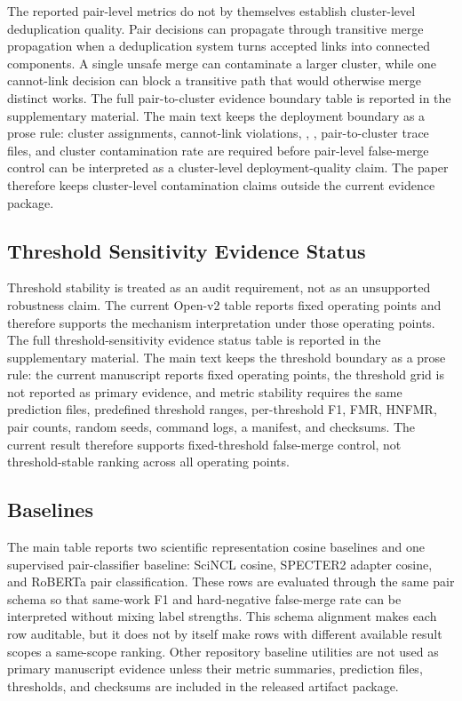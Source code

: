 \documentclass[11pt]{article}
\begin{document}
The reported pair-level metrics do not by themselves establish cluster-level deduplication quality. Pair decisions can propagate through transitive merge propagation when a deduplication system turns accepted links into connected components. A single unsafe merge can contaminate a larger cluster, while one cannot-link decision can block a transitive path that would otherwise merge distinct works. The full pair-to-cluster evidence boundary table is reported in the supplementary material. The main text keeps the deployment boundary as a prose rule: cluster assignments, cannot-link violations, , , pair-to-cluster trace files, and cluster contamination rate are required before pair-level false-merge control can be interpreted as a cluster-level deployment-quality claim. The paper therefore keeps cluster-level contamination claims outside the current evidence package.

\subsection{Threshold Sensitivity Evidence Status}

Threshold stability is treated as an audit requirement, not as an unsupported robustness claim. The current Open-v2 table reports fixed operating points and therefore supports the mechanism interpretation under those operating points. The full threshold-sensitivity evidence status table is reported in the supplementary material. The main text keeps the threshold boundary as a prose rule: the current manuscript reports fixed operating points, the threshold grid is not reported as primary evidence, and metric stability requires the same prediction files, predefined threshold ranges, per-threshold F1, FMR, HNFMR, pair counts, random seeds, command logs, a manifest, and checksums. The current result therefore supports fixed-threshold false-merge control, not threshold-stable ranking across all operating points.

\subsection{Baselines}

The main table reports two scientific representation cosine baselines and one supervised pair-classifier baseline: SciNCL cosine, SPECTER2 adapter cosine, and RoBERTa pair classification. These rows are evaluated through the same pair schema so that same-work F1 and hard-negative false-merge rate can be interpreted without mixing label strengths. This schema alignment makes each row auditable, but it does not by itself make rows with different available result scopes a same-scope ranking. Other repository baseline utilities are not used as primary manuscript evidence unless their metric summaries, prediction files, thresholds, and checksums are included in the released artifact package.
\end{document}
